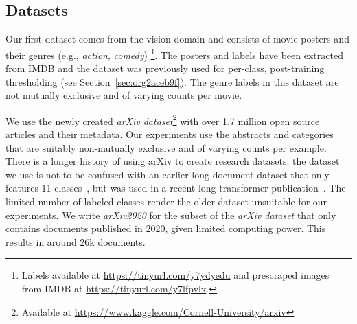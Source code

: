 \subsection{Datasets}

Our first dataset \citep{moviePosters} comes from the vision domain and consists of movie posters and their genres (e.g., \emph{action}, \emph{comedy}) \footnote{Labels available at \url{https://tinyurl.com/y7ydyedu} and prescraped images from IMDB at \url{https://tinyurl.com/y7lfpvlx}.}. The posters and labels have been extracted from IMDB and the dataset was previously used for per-class, post-training thresholding (see Section~\ref{sec:org2aceb9f}). The genre labels in this dataset are not mutually exclusive and of varying counts per movie.

We use the newly created \emph{arXiv dataset}\footnote{Available at \url{https://www.kaggle.com/Cornell-University/arxiv}} with over 1.7 million open source articles and their metadata. Our experiments use the abstracts and categories that are suitably non-mutually exclusive and of varying counts per example. There is a longer history of using arXiv to create research datasets; the dataset we use is not to be confused with an earlier long document dataset that only features 11 classes~\citep{oldarXiv}, but was used in a recent long transformer publication~\cite{bigBird}. The limited number of labeled classes render the older dataset unsuitable for our experiments.  We write \textit{arXiv2020} for the subset of the \emph{arXiv dataset} that only contains documents published in 2020, given limited computing power. This results in around 26k documents.

